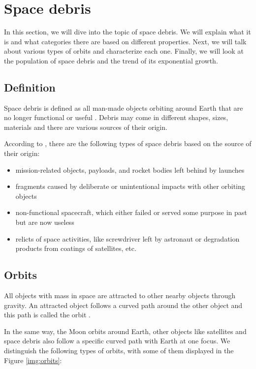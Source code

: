 \section{Space debris}
In this section, we will dive into the topic of space debris. We will explain what it is and what categories there are based on different properties. Next, we will talk about various types of orbits and characterize each one. Finally, we will look at the population of space debris and the trend of its exponential growth. 

\subsection{Definition}
Space debris is defined as all man-made objects orbiting around Earth
that are no longer functional or useful \cite{klinkrad2006space}.
Debris may come in different shapes, sizes, materials and there are various sources of their origin. 

According to \cite{klinkrad2006space}, there are the following types of space debris based on the source of their origin: 
\begin{itemize}
    \item mission-related objects, payloads, and rocket bodies left behind by launches
    \item fragments caused by deliberate or unintentional impacts with other orbiting objects 
    \item non-functional spacecraft, which either failed or served some purpose in past but are now useless
    \item relicts of space activities, like screwdriver left by astronaut or degradation products from coatings of satellites, etc.
\end{itemize}

\subsection{Orbits}

All objects with mass in space are attracted to other nearby objects through gravity. An attracted object follows a curved path around the other object and this path is called the orbit \cite{ESAarticle}.

In the same way, the Moon orbits around Earth, other objects like satellites and space debris also follow a specific curved path with Earth at one focus. We distinguish the following types of orbits, with some of them displayed in the Figure \ref{img:orbits}:

